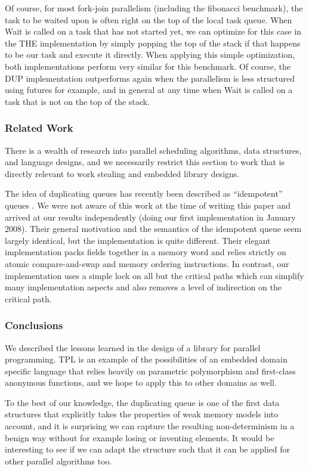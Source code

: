 Of course, for most fork-join parallelism (including the fibonacci
benchmark), the task to be waited upon is often right on the top of
the local task queue. When Wait is called on a task that has not
started yet, we can optimize for this case in the THE implementation
by simply popping the top of the stack if that happens to be our task
and execute it directly. When applying this simple optimization, both
implementations perform very similar for this benchmark. Of course,
the DUP implementation outperforms again when the parallelism is less
structured using futures for example, and in general at any time when
Wait is called on a task that is not on the top of the stack.

\subsubsection{Related Work}

There is a wealth of research into parallel scheduling algorithms,
data structures, and language designs, and we necessarily restrict
this section to work that is directly relevant to work stealing and
embedded library designs.

The idea of duplicating queues has recently been described as
``idempotent'' queues \cite{Michael2009}. We were not aware of this
work at the time of writing this paper and arrived at our results
independently (doing our first implementation in January 2008). Their
general motivation and the semantics of the idempotent queue seem
largely identical, but the implementation is quite different. Their
elegant implementation packs fields together in a memory word and
relies strictly on atomic compare-and-swap and memory ordering
instructions. In contrast, our implementation uses a simple lock on
all but the critical paths which can simplify many implementation
aspects and also removes a level of indirection on the critical path.

\subsubsection{Conclusions}

We described the lessons learned in the design of a library for
parallel programming. TPL is an example of the possibilities of an
embedded domain specific language that relies heavily on parametric
polymorphism and first-class anonymous functions, and we hope to apply
this to other domains as well.

To the best of our knowledge, the duplicating queue is one of the
first data structures that explicitly takes the properties of weak
memory models into account, and it is surprising we can capture the
resulting non-determinism in a benign way without for example losing
or inventing elements. It would be interesting to see if we can adapt
the structure such that it can be applied for other parallel
algorithms too.



